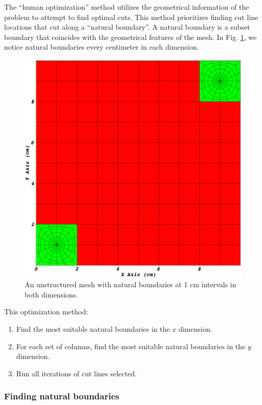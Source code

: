   The ``human optimization'' method utilizes the geometrical information of the problem to attempt to find optimal cuts. This method prioritizes finding cut line locations that cut along a ``natural boundary''. A natural boundary is a subset boundary that coincides with the geometrical features of the mesh. In Fig. \ref{partitioning_example}, we notice natural boundaries every centimeter in each dimension. 
 \begin{figure}[h]
\centering
\includegraphics[scale=0.2]{../figures/spiderweb_10x10_sparse.png}
\caption{An unstructured mesh with natural boundaries at 1 cm intervals in both dimensions.}
\label{partitioning_example}
\end{figure}

This optimization method:
\begin{enumerate}
  \item Find the most suitable natural boundaries in the $x$ dimension.
  \item For each set of columns, find the most suitable natural boundaries in the $y$ dimension.
  \item Run all iterations of cut lines selected. 
\end{enumerate}

\subsubsection{Finding natural boundaries}

